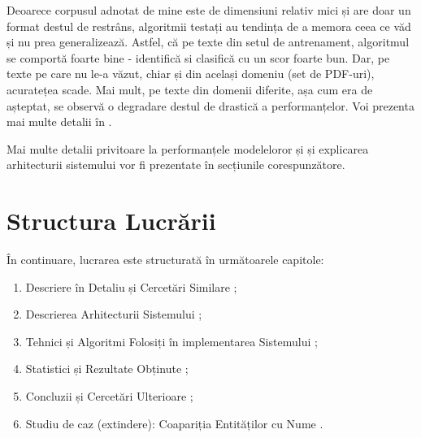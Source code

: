 Deoarece corpusul adnotat de mine este de dimensiuni relativ mici și are doar un format destul de restrâns, algoritmii testați au tendința de a memora ceea ce văd și nu prea generalizează. Astfel, că pe texte din setul de antrenament, algoritmul se comportă foarte bine - identifică si clasifică cu un scor foarte bun. Dar, pe texte pe care nu le-a văzut, chiar și din același domeniu (set de PDF-uri), acuratețea scade. Mai mult, pe texte din domenii diferite, așa cum era de așteptat, se observă o degradare destul de drastică a performanțelor. Voi prezenta mai multe detalii în .

Mai multe detalii privitoare la performanțele modeleloror și și explicarea arhitecturii sistemului vor fi prezentate în secțiunile corespunzătore.

\section{Structura Lucrării}

În continuare, lucrarea este structurată în următoarele capitole:

\begin{enumerate}

\item Descriere în Detaliu și Cercetări Similare ;
\item Descrierea Arhitecturii Sistemului ;
\item Tehnici și Algoritmi Folosiți în implementarea Sistemului ;
\item Statistici și Rezultate Obținute ;
\item Concluzii și Cercetări Ulterioare ;
\item Studiu de caz (extindere): Coapariția Entităților cu Nume .

\end{enumerate}
